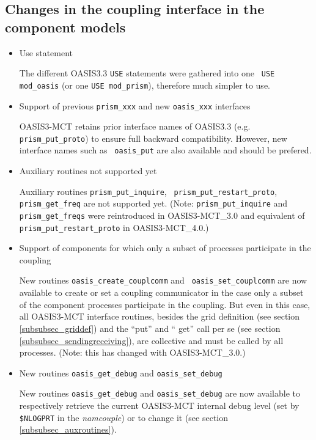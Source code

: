 \subsection{Changes in the coupling interface in the component models}
\label{sec_changes_API}

\begin{itemize}

\item Use statement

The different OASIS3.3 {\tt USE} statements were gathered into one {\tt
  USE mod\_oasis} (or one {\tt USE mod\_prism}), therefore much
  simpler to use.

\item Support of previous {\tt prism\_xxx} and new {\tt oasis\_xxx}
  interfaces

OASIS3-MCT retains prior interface names of OASIS3.3
  (e.g. {\tt prism\_put\_proto}) to ensure full backward
  compatibility. However, new interface names such as {\tt
    oasis\_put} are also available and should be prefered. 

\item Auxiliary routines not supported yet

Auxiliary routines {\tt prism\_put\_inquire}, {\tt
  prism\_put\_restart\_proto}, {\tt prism\_get\_freq} are not
  supported yet. (Note: {\tt prism\_put\_inquire} and {\tt prism\_get\_freqs} were  reintroduced in OASIS3-MCT\_3.0 and equivalent of  {\tt
  prism\_put\_restart\_proto} in OASIS3-MCT\_4.0.)

\item Support of components for which only a subset of processes
  participate in the coupling

New routines {\tt oasis\_create\_couplcomm} and {\tt
  oasis\_set\_couplcomm} are now available to create or set a coupling
  communicator in the case only a subset of the component processes
  participate in the coupling. But
  even in this case, all OASIS3-MCT interface routines, besides the
  grid definition (see section \ref{subsubsec_griddef}) and the
  ``put'' and `` get'' call per se (see section
  \ref{subsubsec_sendingreceiving}), are collective and must be called
  by all processes. (Note: this has changed with OASIS3-MCT\_3.0.)

\item New routines {\tt oasis\_get\_debug} and {\tt oasis\_set\_debug}

New routines {\tt oasis\_get\_debug} and {\tt oasis\_set\_debug}
  are now available to respectively retrieve the current OASIS3-MCT
  internal debug level (set by {\tt \$NLOGPRT} in the {\it namcouple}) or to change it (see section
  \ref{subsubsec_auxroutines}).

\end{itemize}

